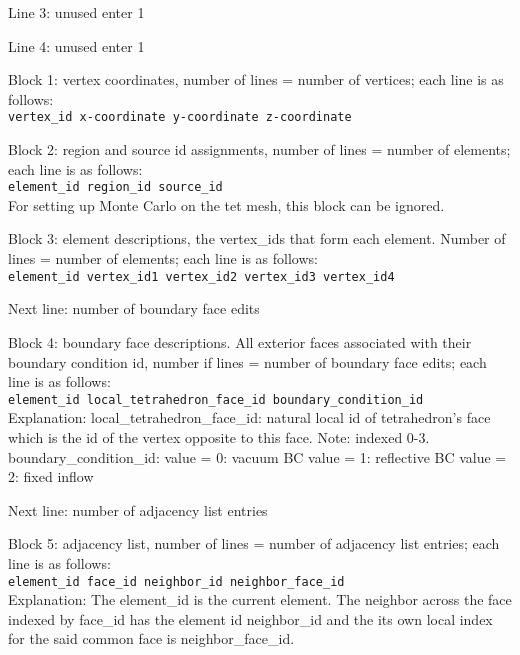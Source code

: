\noindent Line 3: unused enter 1
\vspace{2mm}

\noindent Line 4: unused enter 1
\vspace{2mm}

\noindent Block 1: vertex coordinates, number of lines = number of vertices; each line is as follows: \\
\verb"vertex_id x-coordinate y-coordinate z-coordinate"
\vspace{2mm}

\noindent Block 2: region and source id assignments, number of lines = number of elements; each line is as follows: \\
\verb"element_id region_id source_id"\\
For setting up Monte Carlo on the tet mesh, this block can be ignored.
\vspace{2mm}

\noindent Block 3: element descriptions, the vertex\_ids that form each element. Number of lines = number of elements; each line is as follows: \\
\verb"element_id vertex_id1 vertex_id2 vertex_id3 vertex_id4"
\vspace{2mm}

\noindent Next line: number of boundary face edits
\vspace{2mm}

\noindent Block 4: boundary face descriptions. All exterior faces associated with their boundary condition id, number if lines = number of boundary face edits; each line is as follows: \\
\verb"element_id local_tetrahedron_face_id boundary_condition_id"\\
Explanation: local\_tetrahedron\_face\_id: natural local id of tetrahedron’s face which is the id of the vertex opposite to this face. Note: indexed 0-3.
boundary\_condition\_id:
value = 0: vacuum BC
value = 1: reflective BC
value = 2: fixed inflow
\vspace{2mm}

\noindent Next line: number of adjacency list entries
\vspace{2mm}

\noindent Block 5: adjacency list, number of lines = number of adjacency list entries; each line is as follows: \\
\verb"element_id face_id neighbor_id neighbor_face_id"\\
Explanation: The element\_id is the current element. The neighbor across the face indexed by face\_id has the element id neighbor\_id and the its own local index for the said common face is neighbor\_face\_id.

